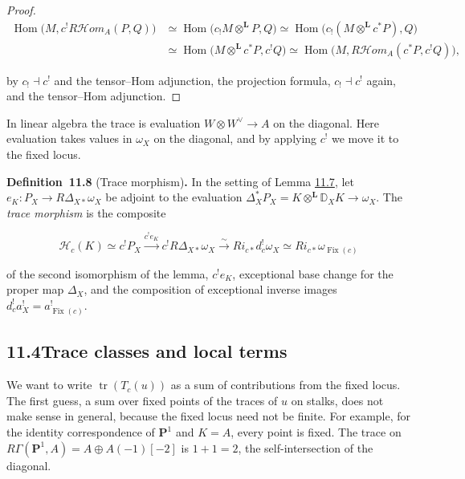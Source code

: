 \documentclass[11pt]{article}
\newenvironment{bpstatement}[2]{\par\addvspace{0.6\baselineskip}\noindent\textbf{#1}#2\textbf{.}\enspace\ignorespaces}
  {\par\addvspace{0.4\baselineskip}}
\providecommand{\Fix}{}\renewcommand{\Fix}{\operatorname{Fix}}
\providecommand{\Hom}{}\renewcommand{\Hom}{\operatorname{Hom}}
\providecommand{\cHom}{}\renewcommand{\cHom}{R\mathcal{H}\!om}
\begin{document}
\begin{proof}[{Proof}]
\[
\begin{aligned}
\Hom\bigl(M,c^!\cHom_A(P,Q)\bigr)
&\simeq\Hom\bigl(c_!M\otimes^{\mathbf L}P,Q\bigr)
\simeq\Hom\bigl(c_!(M\otimes^{\mathbf L}c^*P),Q\bigr)\\
&\simeq\Hom\bigl(M\otimes^{\mathbf L}c^*P,c^!Q\bigr)
\simeq\Hom\bigl(M,\cHom_A(c^*P,c^!Q)\bigr),
\end{aligned}
\]

by \(c_!\dashv c^!\) and the tensor–Hom adjunction, the projection formula, \(c_!\dashv c^!\) again, and the tensor–Hom adjunction.
\end{proof}

\label{bp24}%
In linear algebra the trace is evaluation \(W\otimes W^\vee\to A\) on the diagonal. Here evaluation takes values in \(\omega_X\) on the diagonal, and by applying \(c^!\) we move it to the fixed locus.

\label{bp25}%
\begin{bpstatement}{Definition~11.8}{ (Trace morphism)}
In the setting of Lemma \hyperref[bp22]{11.7}, let \(e_K:P_X\to R\Delta_{X*}\omega_X\) be adjoint to the evaluation \(\Delta_X^*P_X=K\otimes^{\mathbf L} \mathbb D_XK\to\omega_X\). The \emph{trace morphism} is the composite

\[
\mathcal H_c(K)\simeq c^!P_X\xrightarrow{c^!e_K}c^!R\Delta_{X*}\omega_X
\xrightarrow{\sim}Ri_{c*}d_c^!\omega_X
\simeq Ri_{c*}\omega_{\Fix(c)}
\]

of the second isomorphism of the lemma, \(c^!e_K\), exceptional base change for the proper map \(\Delta_X\), and the composition of exceptional inverse images \(d_c^!a_X^!=a_{\Fix(c)}^!\).
\end{bpstatement}


\subsection*{\texorpdfstring{11.4\quad Trace classes and local terms}{11.4 Trace classes and local terms}}
\label{bp26}%
\label{bp27}%
We want to write \(\operatorname{tr}(T_c(u))\) as a sum of contributions from the fixed locus. The first guess, a sum over fixed points of the traces of \(u\) on stalks, does not make sense in general, because the fixed locus need not be finite. For example, for the identity correspondence of \(\mathbf P^1\) and \(K=A\), every point is fixed. The trace on \(R\Gamma(\mathbf P^1,A)=A\oplus A(-1)[-2]\) is \(1+1=2\), the self-intersection of the diagonal.
\end{document}
